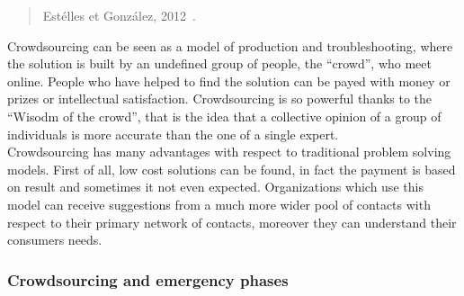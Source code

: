 \begin{quotation}
{\footnotesize
{}
\begin{flushright}
Est\'elles et Gonz\'alez, 2012~\cite{estellesgonzalez}.
\end{flushright}
}
\end{quotation}

\noindent Crowdsourcing can be seen as a model of production and troubleshooting, where the solution is built by an undefined group of people, the ``crowd'', who meet online. People who have helped to find the solution can be payed with money or prizes or intellectual satisfaction. Crowdsourcing is so powerful thanks to the ``Wisodm of the crowd'', that is the idea that a collective opinion of a group of individuals is more accurate than the one of a single expert.
\\
Crowdsourcing has many advantages with respect to traditional problem solving models. First of all, low cost solutions can be found, in fact the payment is based on result and sometimes it not even expected. Organizations which use this model can receive suggestions from a much more wider pool of contacts with respect to their primary network of contacts, moreover they can understand their consumers needs.

\subsubsection{Crowdsourcing and emergency phases}

